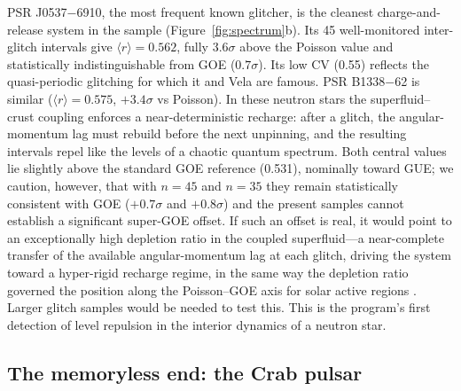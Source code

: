 \documentclass[12pt,a4paper]{article}
\begin{document}
PSR J0537$-$6910, the most frequent known glitcher, is the cleanest charge-and-release system in the sample (Figure~\ref{fig:spectrum}b). Its 45 well-monitored inter-glitch intervals give $\langle r\rangle=0.562$, fully $3.6\sigma$ above the Poisson value and statistically indistinguishable from GOE ($0.7\sigma$). Its low CV (0.55) reflects the quasi-periodic glitching for which it and Vela are famous. PSR B1338$-$62 is similar ($\langle r\rangle=0.575$, $+3.4\sigma$ vs Poisson). In these neutron stars the superfluid--crust coupling enforces a near-deterministic recharge: after a glitch, the angular-momentum lag must rebuild before the next unpinning, and the resulting intervals repel like the levels of a chaotic quantum spectrum. Both central values lie slightly above the standard GOE reference (0.531), nominally toward GUE; we caution, however, that with $n=45$ and $n=35$ they remain statistically consistent with GOE ($+0.7\sigma$ and $+0.8\sigma$) and the present samples cannot establish a significant super-GOE offset. If such an offset is real, it would point to an exceptionally high depletion ratio in the coupled superfluid---a near-complete transfer of the available angular-momentum lag at each glitch, driving the system toward a hyper-rigid recharge regime, in the same way the depletion ratio governed the position along the Poisson--GOE axis for solar active regions \citep{chen2026solar}. Larger glitch samples would be needed to test this. This is the program's first detection of level repulsion in the interior dynamics of a neutron star.

\subsection{The memoryless end: the Crab pulsar}
\end{document}
